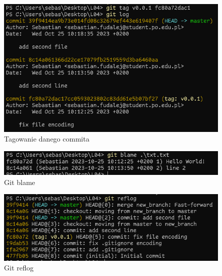 \documentclass{article} %
\begin{document}
\begin{figure}[h]
	\centering
	\includegraphics[width=1\textwidth]{image/git/20.png}
	\caption{Tagowanie danego commita}
\end{figure}

\begin{figure}[h]
	\centering
	\includegraphics[width=1\textwidth]{image/git/21.png}
	\caption{Git blame}
\end{figure}

\begin{figure}
	\centering
	\includegraphics[width=1\textwidth]{image/git/22.png}
	\caption{Git reflog}
\end{figure}
\end{document}
